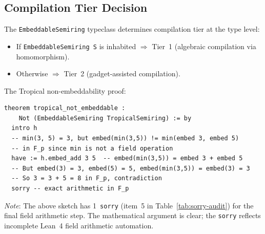 \documentclass[11pt]{article}
\newcommand{\sorry}{\texttt{sorry}}
\begin{document}
\subsection{Compilation Tier Decision}

The \texttt{EmbeddableSemiring} typeclass determines compilation tier
at the type level:
\begin{itemize}[nosep]
\item If \texttt{EmbeddableSemiring S} is inhabited $\Rightarrow$ Tier~1
  (algebraic compilation via homomorphism).
\item Otherwise $\Rightarrow$ Tier~2 (gadget-assisted compilation).
\end{itemize}

The Tropical non-embeddability proof:

\begin{lstlisting}[language=Lean4,caption={Tropical non-embeddability (sketch).}]
theorem tropical_not_embeddable :
    Not (EmbeddableSemiring TropicalSemiring) := by
  intro h
  -- min(3, 5) = 3, but embed(min(3,5)) != min(embed 3, embed 5)
  -- in F_p since min is not a field operation
  have := h.embed_add 3 5  -- embed(min(3,5)) = embed 3 + embed 5
  -- But embed(3) = 3, embed(5) = 5, embed(min(3,5)) = embed(3) = 3
  -- So 3 = 3 + 5 = 8 in F_p, contradiction
  sorry -- exact arithmetic in F_p
\end{lstlisting}

\emph{Note}: The above sketch has 1~\sorry{} (item~5 in
Table~\ref{tab:sorry-audit}) for the final field arithmetic step.
The mathematical argument is clear; the \sorry{} reflects incomplete
Lean~4 field arithmetic automation.
\end{document}
